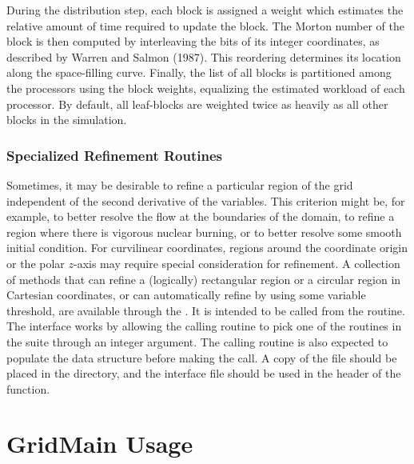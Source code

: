 During the distribution step, each block is assigned a weight which
estimates the relative amount of time required to update the block.
The Morton number of the block is then
computed by interleaving the bits of its integer coordinates,
as described by Warren and Salmon (1987).  This reordering determines its
location along the space-filling curve.
Finally, the list of all
blocks is partitioned among the processors using the block weights,
equalizing the estimated workload of each processor.  By default, all leaf-blocks 
are weighted twice as heavily as all other blocks in the simulation.


\subsubsection{Specialized Refinement Routines}
\label{Sec:MarkRefLib}
Sometimes, it may be desirable to refine a particular region of
the grid independent of the second derivative of the variables.
This criterion might be, for example, to better resolve the flow at the
boundaries of the domain, to refine a region where there is vigorous
nuclear burning, or to better resolve some smooth initial condition.
For curvilinear coordinates, regions around the coordinate origin
or the polar $z$-axis may require special consideration for refinement.
A collection of methods that can refine a (logically) rectangular region
or a circular region in Cartesian coordinates, or can automatically
refine by using some variable threshold, are available through the 
.
It  is intended to be called from 
 the  routine.  The interface works
by allowing the calling routine to pick one of the routines in the
suite through an integer argument. The calling routine is also
expected to populate the data structure  before making the
call. A copy of the file  should be
placed in the  directory, and the interface
file  should be used
in the header of the function.



\section{GridMain Usage}
\label{Sec:usage}

